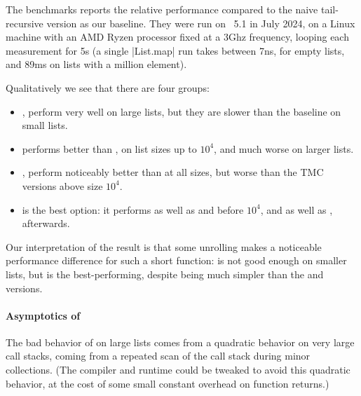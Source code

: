 The benchmarks reports the relative performance compared to the naive tail-recursive version as our baseline. They were run on \OCaml~5.1 in July 2024, on a Linux machine with an AMD Ryzen processor fixed at a 3Ghz frequency, looping each measurement for 5s (a single \ocaml|List.map| run takes between 7ns, for empty lists, and 89ms on lists with a million element).

Qualitatively we see that there are four groups:
\begin{itemize}
\item {},  perform very well on large lists, but they
  are slower than the baseline on small lists.
\item {} performs better than ,  on list sizes up to $10^4$, and much worse on larger lists.
\item {},  perform noticeably better than  at all sizes,
  but worse than the TMC versions above size $10^4$.
\item {} is the best option: it performs as well as  and  before $10^4$, and as well as ,  afterwards.
\end{itemize}
Our interpretation of the result is that some unrolling makes a noticeable performance difference for such a short function:  is not good enough on smaller lists, but  is the best-performing, despite being much simpler than the  and  versions.

\paragraph{Asymptotics of } The bad behavior of  on large lists comes from a quadratic behavior on very large call stacks, coming from a repeated scan of the call stack during minor collections. (The \OCaml compiler and runtime could be tweaked to avoid this quadratic behavior, at the cost of some small constant overhead on function returns.)


